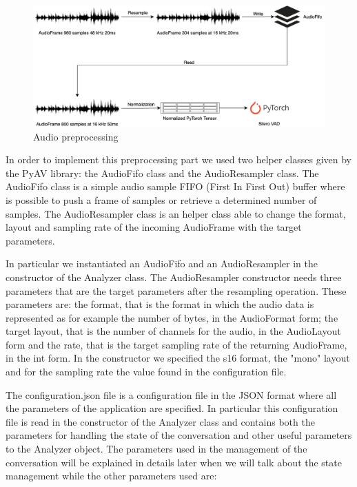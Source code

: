 \documentclass[../main.tex]{subfiles}
\begin{document}
\begin{figure}[ht]
    \centering
    \includegraphics[width=\textwidth]{images/Audio preprocessing2.png}
    \caption{Audio preprocessing}
    \label{fig:audio preprocessing}
\end{figure}

In order to implement this preprocessing part we used two helper classes given by the PyAV library: the AudioFifo class and the AudioResampler class. The AudioFifo class is a simple audio sample FIFO (First In First Out) buffer where is possible to push a frame of samples or retrieve a determined number of samples. The AudioResampler class is an helper class able to change the format, layout and sampling rate of the incoming AudioFrame with the target parameters. 

In particular we instantiated an AudioFifo and an AudioResampler in the constructor of the Analyzer class. The AudioResampler constructor needs three parameters that are the target parameters after the resampling operation. These parameters are: the format, that is the format in which the audio data is represented as for example the number of bytes, in the AudioFormat form; the target layout, that is the number of channels for the audio, in the AudioLayout form and the rate, that is the target sampling rate of the returning AudioFrame, in the int form. In the constructor we specified the s16 format, the "mono" layout and for the sampling rate the value found in the configuration file. 

The configuration.json file is a configuration file in the JSON format where all the parameters of the application are specified. In particular this configuration file is read in the constructor of the Analyzer class and contains both the parameters for handling the state of the conversation and other useful parameters to the Analyzer object. The parameters used in the management of the conversation will be explained in details later when we will talk about the state management while the other parameters used are:
\end{document}
